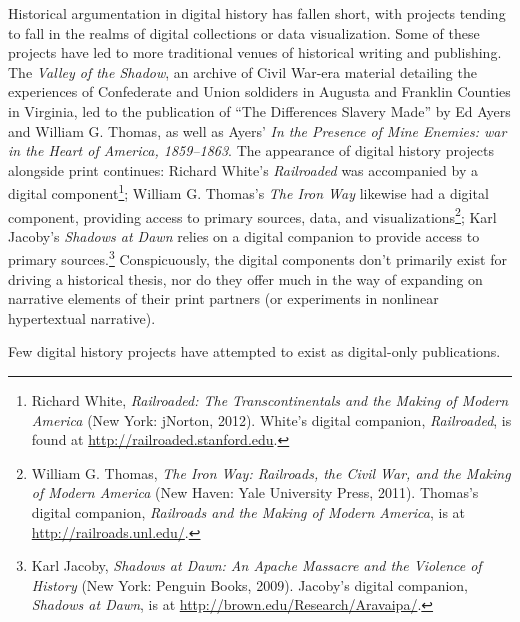 \documentclass[11pt,]{article}
\begin{document}
\noindent  Historical argumentation in digital history has fallen short, with
projects tending to fall in the realms of digital collections or data
visualization. Some of these projects have led to more traditional
venues of historical writing and publishing. The \emph{Valley of the
Shadow}, an archive of Civil War-era material detailing the experiences
of Confederate and Union soldiders in Augusta and Franklin Counties in
Virginia, led to the publication of ``The Differences Slavery Made'' by
Ed Ayers and William G. Thomas, as well as Ayers' \emph{In the Presence
of Mine Enemies: war in the Heart of America, 1859--1863}. The
appearance of digital history projects alongside print continues:
Richard White's \emph{Railroaded} was accompanied by a digital
component\footnote{Richard White, \emph{Railroaded: The
  Transcontinentals and the Making of Modern America} (New York:
  jNorton, 2012). White's digital companion, \emph{Railroaded}, is found
  at \url{http://railroaded.stanford.edu}.}; William G. Thomas's
\emph{The Iron Way} likewise had a digital component, providing access
to primary sources, data, and visualizations\footnote{William G. Thomas,
  \emph{The Iron Way: Railroads, the Civil War, and the Making of Modern
  America} (New Haven: Yale University Press, 2011). Thomas's digital
  companion, \emph{Railroads and the Making of Modern America}, is at
  \url{http://railroads.unl.edu/}.}; Karl Jacoby's \emph{Shadows at
Dawn} relies on a digital companion to provide access to primary
sources.\footnote{Karl Jacoby, \emph{Shadows at Dawn: An Apache Massacre
  and the Violence of History} (New York: Penguin Books, 2009). Jacoby's
  digital companion, \emph{Shadows at Dawn}, is at
  \url{http://brown.edu/Research/Aravaipa/}.} Conspicuously, the digital
components don't primarily exist for driving a historical thesis, nor do
they offer much in the way of expanding on narrative elements of their
print partners (or experiments in nonlinear hypertextual narrative).

Few digital history projects have attempted to exist as digital-only
publications.


\newpage
\singlespacing 
\end{document}
